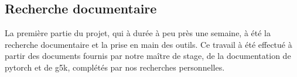 \subsection{Recherche documentaire}
La première partie du projet, qui à durée à peu près une semaine, à été la recherche documentaire et la prise en main des outils.
Ce travail à été effectué à partir des documents fournis par notre maître de stage, de la documentation de \gls{pytorch}\autocite{60MinBlitzTorch,ByExampleTorch,Classify,doc_pytorch} et de \gls{g5k}, complétés par nos recherches personnelles.

